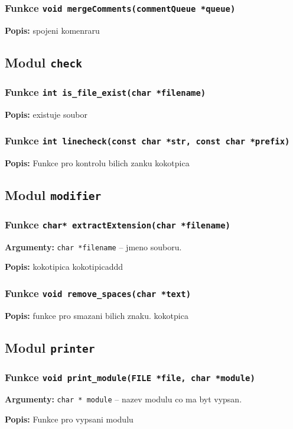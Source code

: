 \documentclass[12pt, a4paper]{article}
\begin{document}
\subsubsection{Funkce \texttt{void mergeComments(commentQueue *queue)}}
\textbf{Popis: }spojeni komenraru\\
\par\noindent
\subsection{Modul \texttt{check}}
\subsubsection{Funkce \texttt{int is\_file\_exist(char *filename)}}
\textbf{Popis: }existuje soubor\\
\par\noindent
\subsubsection{Funkce \texttt{int linecheck(const char *str, const char *prefix)}}
\textbf{Popis: }Funkce pro kontrolu bilich zanku kokotpica\\
\par\noindent
\subsection{Modul \texttt{modifier}}
\subsubsection{Funkce \texttt{char* extractExtension(char *filename)}}
\textbf{Argumenty: }\verb"char *filename" -- jmeno souboru. \\
\par\noindent
\textbf{Popis: }kokotipica kokotipicaddd\\
\par\noindent
\subsubsection{Funkce \texttt{void remove\_spaces(char *text)}}
\textbf{Popis: }funkce pro smazani bilich znaku. kokotpica\\
\par\noindent
\subsection{Modul \texttt{printer}}
\subsubsection{Funkce \texttt{void print\_module(FILE *file, char *module)}}
\textbf{Argumenty: }\verb"char * module" -- nazev modulu co ma byt vypsan. \\
\par\noindent
\textbf{Popis: }Funkce pro vypsani modulu\\
\par\noindent
\end{document}

